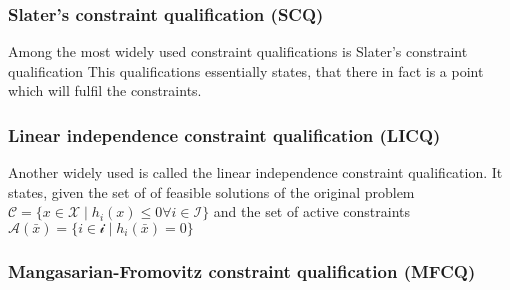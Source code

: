     \subsubsection{Slater's constraint qualification (SCQ)}
    Among the most widely used constraint qualifications is Slater's constraint qualification
    This qualifications essentially states, that there in fact is a point which will fulfil the constraints. 

    \subsubsection{Linear independence constraint qualification (LICQ)}
    Another widely used is called the linear independence constraint qualification. It states, 
    given the set of of feasible solutions of the original problem $\mathcal{C} = \{x \in \mathcal{X} \; | \; h_i(x) \leq 0
    \forall i \in \mathcal{I} \}$ and the set of active constraints $\mathcal{A}(\bar{x}) = \{i \in \mathcal{i} \; | \; h_i(\bar{x}) = 0 \}$
    
    \subsubsection{Mangasarian-Fromovitz constraint qualification (MFCQ)}
